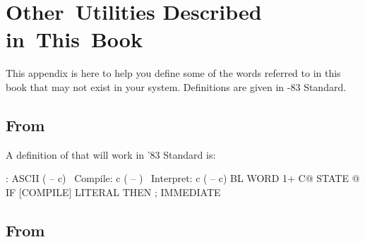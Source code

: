 \chapter{Other~Utilities Described in~This~Book}

\initial This appendix is here to help you define some of the words 
referred to in this book that may not exist in your system.
Definitions are given in \Forth{}-83 Standard.

\section{From }

A definition of  that will work in '83
Standard is:
\begin{Code}
: ASCII  ( -- c)  \  Compile:  c  ( -- )
\ Interpret:   c   ( -- c)
     BL WORD 1+ C@  STATE @
     IF [COMPILE] LITERAL  THEN ; IMMEDIATE
\end{Code}

\section{From }

